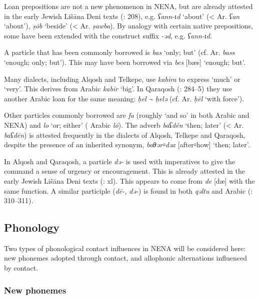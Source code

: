 \documentclass[output=paper]{langsci/langscibook}
\begin{document}
Loan {prepositions} are not a new phenomenon in NENA, but are already attested in the early Jewish Lišāna Deni texts (\citealt{Sabar1984}: 208), e.g. \textit{ʕann\nobreakdash-ɩd} ‘about’ (< Ar. \textit{ʕan} ‘about’), \textit{ṣōb} ‘beside’ (< Ar. \textit{ṣawba}). By {analogy} with certain native {prepositions}, some have been extended with the construct suffix \textit{\nobreakdash-əd}, e.g. \textit{ʕann\nobreakdash-ɩd}.

A p{article} that has been commonly borrowed is \textit{bas} ‘only; but’ (cf.  Ar. \textit{bass} ‘enough; only; but’). This may have been borrowed via  \textit{bes} [bæs] ‘enough; but’.

Many dialects, including  Alqosh and  Telkepe, use \textit{kabira} to express ‘much’ or ‘very’. This derives from Arabic \textit{kabīr} ‘big’. In  Qaraqosh (\citealt{Khan2002}: 284–5) they use another Arabic loan for the same meaning: \textit{ḥel {\textasciitilde} ḥelə} (cf.  Ar. \textit{ḥēl} ‘with force’).

Other particles commonly borrowed are \textit{fa} (roughly ‘and so’ in both Arabic and NENA) and \textit{lo} ‘or; either’ ( Arabic \textit{lō}). The adverb \textit{baʕdén} ‘then; later’ (< Ar. \textit{baʕdēn}) is attested frequently in the  dialects of Alqosh, Telkepe and Qaraqosh, despite the presence of an inherited synonym, \textit{baθər꞊dəx} [after꞊how] ‘then; later’.

In  Alqosh and  Qaraqosh, a particle \textit{də\nobreakdash-} is used with imperatives to give the command a sense of urgency or encouragement. This is already attested in the early Jewish Lišāna Deni texts (\citealt{Sabar1976}: xl). This appears to come from  \textit{de} [dæ] with the same function. A similar {participle} (\textit{dē\nobreakdash-,} \textit{də\nobreakdash-}) is found in both \textit{qəltu} and  Arabic (\citealt{Jastrow1978}: 310–311).

\subsection{Phonology}

Two types of phonological contact influences in NENA will be considered here: new phonemes adopted through contact, and allophonic alternations influenced by contact.

\subsubsection{New phonemes}
\end{document}
